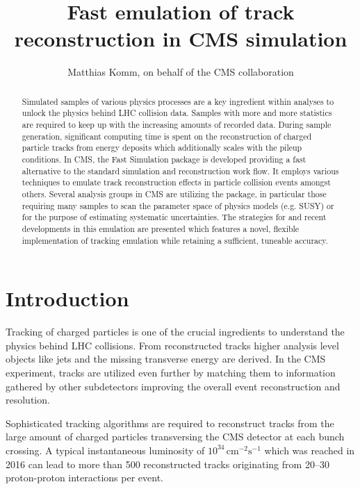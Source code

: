 \documentclass[a4paper]{jpconf}
\begin{document}
\title{Fast emulation of track reconstruction in CMS simulation}

\author{Matthias Komm, on behalf of the CMS collaboration}

\address{Centre for Cosmology, Particle Physics and Phenomenology,
Universit\'e catholique de Louvain, Louvain-la-Neuve, BELGIUM}


\begin{abstract}
Simulated samples of various physics processes are a key ingredient within analyses to unlock the physics behind LHC collision data. Samples with more and more statistics are required to keep up with the increasing amounts of recorded data. During sample generation, significant computing time is spent on the reconstruction of charged particle tracks from energy deposits which additionally scales with the pileup conditions. In CMS, the Fast Simulation package is developed providing a fast alternative to the standard simulation and reconstruction work flow. It employs various techniques to emulate track reconstruction effects in particle collision events amongst others. Several analysis groups in CMS are utilizing the package, in particular those requiring many samples to scan the parameter space of physics models (e.g. SUSY) or for the purpose of estimating systematic uncertainties. The strategies for and recent developments in this emulation are presented which features a novel, flexible implementation of tracking emulation while retaining a sufficient, tuneable accuracy.
\end{abstract}

\section{Introduction}
Tracking of charged particles is one of the crucial ingredients to understand the physics behind LHC collisions. From reconstructed tracks higher analysis level objects like jets and the missing transverse energy are derived. In the CMS experiment, tracks are utilized even further by matching them to information gathered by other subdetectors improving the overall event reconstruction and resolution.

Sophisticated tracking algorithms are required to reconstruct tracks from the large amount of charged particles transversing the CMS detector at each bunch crossing. A typical instantaneous luminosity of $10^{34}\,\mathrm{cm}^{-2}\mathrm{s}^{-1}$ which was reached in 2016 can lead to more than 500 reconstructed tracks originating from 20--30 proton-proton interactions per event.
\end{document}
